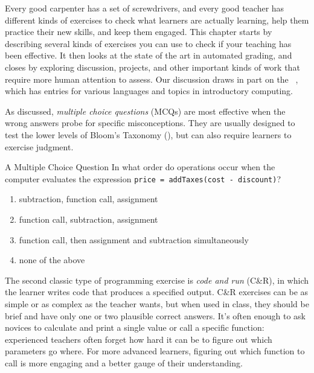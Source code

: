 
Every good carpenter has a set of screwdrivers,
and every good teacher has different kinds of exercises
to check what learners are actually learning,
help them practice their new skills,
and keep them engaged.
This chapter starts by describing several kinds of exercises
you can use to check if your teaching has been effective.
It then looks at the state of the art in automated grading,
and closes by exploring discussion, projects, and other important kinds of work
that require more human attention to assess.
Our discussion draws in part on
the ~\cite{Sand2013},
which has entries for various languages and topics in introductory computing.


As  discussed,
\emph{multiple choice questions} (MCQs) are most effective
when the wrong answers probe for specific misconceptions.
They are usually designed to test the lower levels of Bloom's Taxonomy (),
but can also require learners to exercise judgment.

\begin{aside}{A Multiple Choice Question}
  In what order do operations occur when the computer evaluates the
  expression \texttt{price\ =\ addTaxes(cost\ -\ discount)}?
  \begin{enumerate}
  \item
    subtraction, function call, assignment
  \item
    function call, subtraction, assignment
  \item
    function call, then assignment and subtraction simultaneously
  \item
    none of the above
  \end{enumerate}
\end{aside}

The second classic type of programming exercise is \emph{code and run} (C\&R),
in which the learner writes code that produces a specified output.
C\&R exercises can be as simple or as complex as the teacher wants,
but when used in class,
they should be brief and have only one or two plausible correct answers.
It's often enough to ask novices to calculate and print a single value
or call a specific function:
experienced teachers often forget
how hard it can be to figure out which parameters go where.
For more advanced learners,
figuring out which function to call is more engaging
and a better gauge of their understanding.

